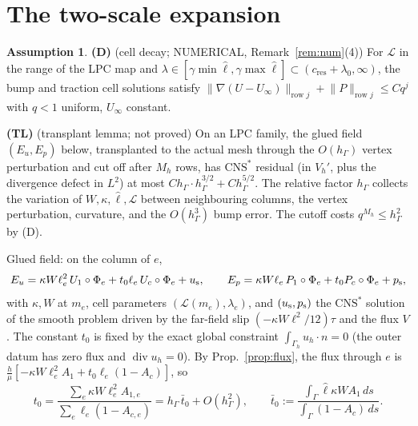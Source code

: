 \documentclass[11pt,reqno]{amsart}
\theoremstyle{plain}
\theoremstyle{definition}
\newtheorem{assumption}[theorem]{Assumption}
\newcommand{\hG}{h_\Gamma}
\newcommand{\Gh}{\Gamma_h}
\newcommand{\norm}[1]{\lVert #1\rVert}
\newcommand{\CNS}{\mathrm{CNS}^\ast}
\renewcommand{\div}{\operatorname{div}}
\newcommand{\Lc}{\mathcal L}
\newcommand{\cc}{c_{\mathrm{res}}}
\begin{document}
\section{The two-scale expansion}

\begin{assumption}\label{ass:D}
\textbf{(D)} (cell decay; NUMERICAL, Remark~\ref{rem:num}(4)) For $\Lc$ in the range of the LPC map and $\lambda\in[\gamma\min\hat\ell,\gamma\max\hat\ell]\subset(\cc+\lambda_0,\infty)$, the bump and traction cell solutions satisfy $\norm{\nabla(U-U_\infty)}_{\text{row }j}+\norm P_{\text{row }j}\le Cq^j$ with $q<1$ uniform, $U_\infty$ constant.

\textbf{(TL)} (transplant lemma; not proved) On an LPC family, the glued field $(E_u,E_p)$ below, transplanted to the actual mesh through the $O(\hG)$ vertex perturbation and cut off after $M_h$ rows, has $\CNS$ residual (in $V_h'$, plus the divergence defect in $L^2$) at most $C\hG\cdot\hG^{3/2}+C\hG^{5/2}$. The relative factor $\hG$ collects the variation of $W,\kappa,\hat\ell,\Lc$ between neighbouring columns, the vertex perturbation, curvature, and the $O(\hG^3)$ bump error. The cutoff costs $q^{M_h}\le\hG^2$ by (D).
\end{assumption}

\noindent Glued field: on the column of $e$,
\[
E_u=\kappa W\ell_e^2\,U_1\circ\Phi_e+t_0\ell_e\,U_c\circ\Phi_e+u_{\rm s},\qquad E_p=\kappa W\ell_e\,P_1\circ\Phi_e+t_0P_c\circ\Phi_e+p_{\rm s},
\]
with $\kappa,W$ at $m_e$, cell parameters $(\Lc(m_e),\lambda_e)$, and $(u_{\rm s},p_{\rm s})$ the $\CNS$ solution of the smooth problem driven by the far-field slip $(-\kappa W\ell^2/12)\tau$ and the flux $V$. The constant $t_0$ is fixed by the exact global constraint $\int_{\Gh}u_h\cdot n=0$ (the outer datum has zero flux and $\div u_h=0$). By Prop.~\ref{prop:flux}, the flux through $e$ is $\frac h\mu[-\kappa W\ell_e^2A_1+t_0\ell_e(1-A_c)]$, so
\[
t_0=\frac{\sum_e\kappa W\ell_e^2A_{1,e}}{\sum_e\ell_e(1-A_{c,e})}=\hG\,\bar t_0+O(\hG^2),\qquad \bar t_0:=\frac{\int_\Gamma\hat\ell\kappa WA_1\,ds}{\int_\Gamma(1-A_c)\,ds}.
\]
\end{document}
